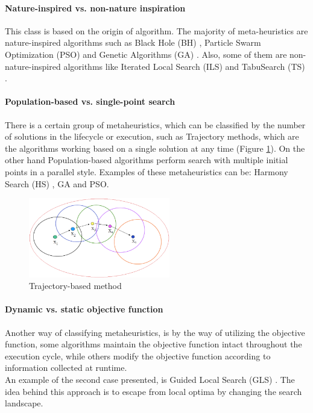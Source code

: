 \paragraph{Nature-inspired vs. non-nature inspiration }
This class is based on the origin of algorithm. The majority of meta-heuristics are nature-inspired algorithms such as Black Hole (BH) \cite{Rubio2016}, Particle Swarm Optimization (PSO) \cite{Duran:2010:CPS:1645454.1645859} and Genetic Algorithms (GA) \cite{DBLP:conf/icsi/CrawfordSPJPO14}. Also, some of them are non-nature-inspired algorithms like Iterated Local Search (ILS) \cite{DBLP:journals/networks/AringhieriGHS16} and TabuSearch (TS) \cite{DBLP:journals/eswa/SotoCGMP13}.

\paragraph{Population-based vs. single-point search}
There is a certain group of metaheuristics, which can be classified by the number of solutions in the lifecycle or execution, such as Trajectory methods, which are the algorithms working based on a single solution at any time (Figure \ref{fig:trajectory-method}). On the other hand Population-based algorithms perform search with multiple initial points in a parallel style. Examples of these metaheuristics can be: Harmony Search (HS) \cite{DBLP:conf/ccece/Al-AjmiE14}, GA \cite{Aupetit2008} and PSO. 

\squeezeup
\begin{figure}[H]
	\centering
  \includegraphics[width=0.55\textwidth]{MarcoTeorico/imagenes/trajectory-mh.png}
	\caption{Trajectory-based method}\label{fig:trajectory-method}
\end{figure}
\squeezeup

\paragraph{Dynamic vs. static objective function}
Another way of classifying metaheuristics, is by the way of utilizing the objective function, some algorithms maintain the objective function intact throughout the execution cycle, while others modify the objective function according to information collected at runtime.\\
An example of the second case presented, is Guided Local Search (GLS) \cite{DBLP:journals/eor/VansteenwegenSBO09}.  The idea behind this approach is to escape from local optima by changing the search landscape. 


